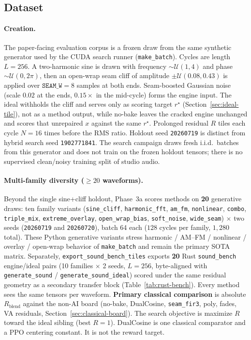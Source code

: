 \subsection{Dataset}
\label{sec:dataset}

\paragraph{Creation.}
The paper-facing evaluation corpus is a frozen draw from the same synthetic generator used by the CUDA search runner (\texttt{make\_batch}).
Cycles are length $L{=}256$.
A two-harmonic sine is drawn with frequency $\sim\mathcal{U}(1,4)$ and phase $\sim\mathcal{U}(0,2\pi)$, then an open-wrap seam cliff of amplitude $\pm\mathcal{U}(0.08,0.43)$ is applied over $\texttt{SEAM\_W}{=}8$ samples at both ends.
Seam-boosted Gaussian noise (scale $0.02$ at the ends, $0.15\times$ in the mid-cycle) forms the engine input.
The ideal withholds the cliff and serves only as scoring target $r^{\star}$ (Section~\ref{sec:ideal-tile}), not as a method output, while no-bake leaves the cracked engine unchanged and scores that unrepaired $x$ against the same $r^{\star}$.
Prolonged residual $R$ tiles each cycle $N{=}16$ times before the RMS ratio.
Holdout seed \texttt{20260719} is distinct from hybrid search seed \texttt{1902771841}.
The search campaign draws fresh i.i.d.\ batches from this generator and does not train on the frozen holdout tensors; there is no supervised clean/noisy training split of studio audio.

\paragraph{Multi-family diversity ($\ge 20$ waveforms).}
Beyond the single sine{+}cliff holdout, Phase~3a scores methods on \textbf{20} generative draws: ten family variants (\texttt{sine\_cliff}, \texttt{harmonic\_fft}, \texttt{am\_fm}, \texttt{nonlinear}, \texttt{combo}, \texttt{triple\_mix}, \texttt{extreme\_overlay}, \texttt{open\_wrap\_bias}, \texttt{soft\_noise}, \texttt{wide\_seam}) $\times$ two seeds (\texttt{20260719} and \texttt{20260720}), batch 64 each ($128$ cycles per family, $1{,}280$ total).
These Python generative variants stress harmonic / AM--FM / nonlinear / overlay / open-wrap behavior of \texttt{make\_batch} and remain the primary SOTA matrix.
Separately, \texttt{export\_sound\_bench\_tiles} exports \textbf{20} Rust \texttt{sound\_bench} engine/ideal pairs (10 families $\times$ 2 seeds, $L{=}256$, byte-aligned with \texttt{generate\_sound} / \texttt{generate\_sound\_ideal}) scored under the same residual geometry as a secondary transfer block (Table~\ref{tab:rust-bench}).
Every method sees the same tensors per waveform.
\textbf{Primary classical comparison} is absolute $R_{\mathrm{blend}}$ against the non-AI board (no-bake, DualCosine, \texttt{seam\_fir3}, poly, fades, VA residuals, Section~\ref{sec:classical-board}).
The search objective is maximize $R$ toward the ideal sibling (best $R{=}1$).
DualCosine is one classical comparator and a PPO centering constant.
It is not the reward target.

